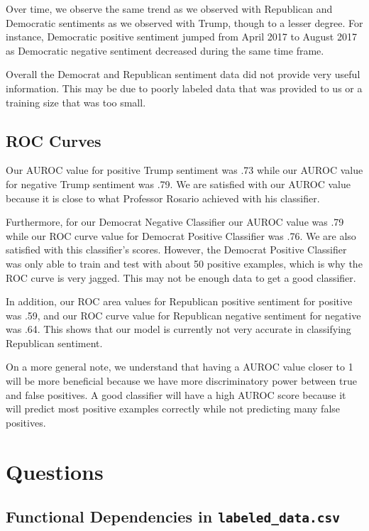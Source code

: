 \documentclass[12pt]{article}
\begin{document}
Over time, we observe the same trend as we observed with Republican and Democratic sentiments as we observed with Trump, though to a
lesser degree. For instance, Democratic positive sentiment jumped from April 2017 to August 2017 as Democratic negative sentiment
decreased during the same time frame.

Overall the Democrat and Republican sentiment data did not provide very useful information. This may be due to poorly labeled data
that was provided to us or a training size that was too small.

\subsection{ROC Curves}

Our AUROC value for positive Trump sentiment was .73 while our AUROC value for negative Trump sentiment was .79.
We are satisfied with our AUROC value because it is close to what Professor Rosario achieved with his classifier.

Furthermore, for our Democrat Negative Classifier our AUROC value was .79 while our ROC curve value for Democrat
Positive Classifier was .76. We are also satisfied with this classifier's scores. However, the Democrat Positive
Classifier was only able to train and test with about 50 positive examples, which is why the ROC curve is very jagged.
This may not be enough data to get a good classifier.

In addition, our ROC area values for Republican positive sentiment for positive was .59, and our ROC curve value
for Republican negative sentiment for negative was .64. This shows that our model is currently not very accurate
in classifying Republican sentiment.

On a more general note, we understand that having a AUROC value closer to 1 will be
more beneficial because we have more discriminatory power between true and false positives. A good
classifier will have a high AUROC score because it will predict most positive examples correctly while not predicting
many false positives.

\section{Questions}

\subsection{Functional Dependencies in \texttt{labeled\_data.csv}}
\end{document}
